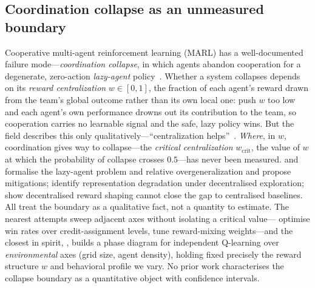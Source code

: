 \documentclass[letterpaper]{article}
\theoremstyle{plain}
\newcommand{\wcrit}{w_{\mathrm{crit}}}
\begin{document}
\subsection{Coordination collapse as an unmeasured boundary}
Cooperative multi-agent reinforcement learning (MARL) has a well-documented
failure mode---\emph{coordination collapse}, in which agents abandon cooperation
for a degenerate, zero-action \emph{lazy-agent}
policy~\citep{liu2023lazy,peng2023curo}. Whether a system collapses depends on
its \emph{reward centralization} $w\in[0,1]$, the fraction of each agent's reward
drawn from the team's global outcome rather than its own local one: push $w$ too
low and each agent's own performance drowns out its contribution to the team, so
cooperation carries no learnable signal and the safe, lazy policy wins. But the
field describes this only qualitatively---``centralization
helps''~\citep{liu2023lazy,dmarl2025}. \emph{Where}, in $w$, coordination gives
way to collapse---the \emph{critical centralization} $\wcrit$, the value of $w$
at which the probability of collapse crosses $0.5$---has never been measured.
\citet{liu2023lazy} and \citet{peng2023curo} formalise the lazy-agent problem and
relative overgeneralization and propose mitigations; \citet{weng2026} identify
representation degradation under decentralised exploration; \citet{dmarl2025}
show decentralised reward shaping cannot close the gap to centralised baselines.
All treat the boundary as a qualitative fact, not a quantity to estimate. The
nearest attempts sweep adjacent axes without isolating a critical
value---\citet{wang2025maca} optimise win rates over credit-assignment levels,
\citet{jiang2018dgn} tune reward-mixing weights---and the closest in spirit,
\citet{yamaguchi2025}, builds a phase diagram for independent Q-learning over
\emph{environmental} axes (grid size, agent density), holding fixed precisely the
reward structure $w$ and behavioral profile we vary. No prior work characterises
the collapse boundary as a quantitative object with confidence intervals.

\end{document}
